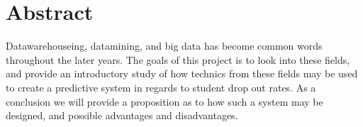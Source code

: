 \section*{Abstract}
	Datawarehouseing, datamining, and big data has become common words throughout the later years. 
	The goals of this project is to look into these fields, and provide an introductory study of how
	technics from these fields may be used to create a predictive system in regards to student drop out rates. 
	As a conclusion we will provide a proposition as to how such a system may be designed, and possible
	advantages and disadvantages.
	